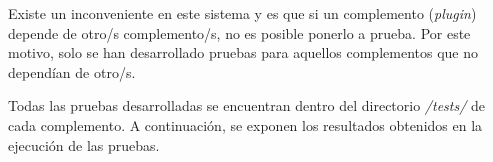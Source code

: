 Existe un inconveniente en este sistema y es que si un complemento
(\emph{plugin}) depende de otro/s complemento/s, no es posible ponerlo a
prueba. Por este motivo, solo se han desarrollado pruebas para aquellos
complementos que no dependían de otro/s.

Todas las pruebas desarrolladas se encuentran dentro del directorio
\emph{/tests/} de cada complemento. A continuación, se exponen los
resultados obtenidos en la ejecución de las pruebas.

